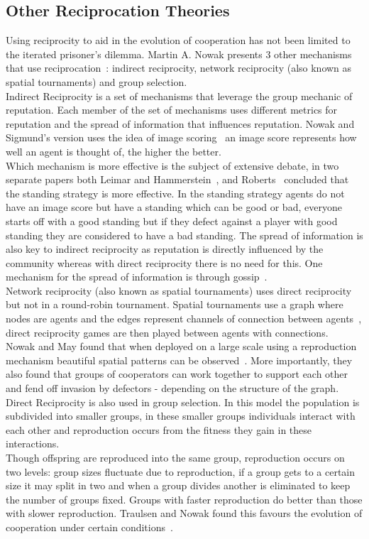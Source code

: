 \documentclass[twoside,twocolumn]{article}
\begin{document}
\subsection{Other Reciprocation Theories}
Using reciprocity to aid in the evolution of cooperation has not been limited to the iterated prisoner's dilemma. Martin A. Nowak presents 3 other mechanisms that use reciprocation~\cite{five_rules_coop}: indirect reciprocity, network reciprocity (also known as spatial tournaments) and group selection.\\
Indirect Reciprocity is a set of mechanisms that leverage the group mechanic of reputation. Each member of the set of mechanisms uses different metrics for reputation and the spread of information that influences reputation. Nowak and Sigmund's version uses the idea of image scoring~\cite{evol_indirect_image} an image score represents how well an agent is thought of, the higher the better.\\
Which mechanism is more effective is the subject of extensive debate, in two separate papers both Leimar and Hammerstein~\cite{leimarhammer}, and Roberts~\cite{evoldirindir} concluded that the standing strategy is more effective. In the standing strategy agents do not have an image score but have a standing which can be good or bad, everyone starts off with a good standing but if they defect against a player with good standing they are considered to have a bad standing. The spread of information is also key to indirect reciprocity as reputation is directly influenced by the community whereas with direct reciprocity there is no need for this. One mechanism for the spread of information is through gossip~\cite{gossip_alt}.\\
Network reciprocity (also known as spatial tournaments) uses direct reciprocity but not in a round-robin tournament. Spatial tournaments use a graph where nodes are agents and the edges represent channels of connection between agents~\cite{evol_graph}, direct reciprocity games are then played between agents with connections.\\
Nowak and May found that when deployed on a large scale using a reproduction mechanism beautiful spatial patterns can be observed~\cite{spatial}. More importantly, they also found that groups of cooperators can work together to support each other and fend off invasion by defectors - depending on the structure of the graph.\\
Direct Reciprocity is also used in group selection. In this model the population is subdivided into smaller groups, in these smaller groups individuals interact with each other and reproduction occurs from the fitness they gain in these interactions. \\
Though offspring are reproduced into the same group, reproduction occurs on two levels: group sizes fluctuate due to reproduction, if a group gets to a certain size it may split in two and when a group divides another is eliminated to keep the number of groups fixed. Groups with faster reproduction do better than those with slower reproduction. Traulsen and Nowak found this favours the evolution of cooperation under certain conditions~\cite{multilevel_nowak}.
\end{document}
